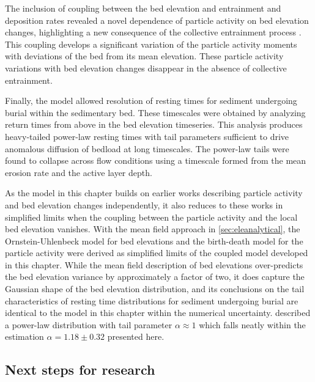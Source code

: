 The inclusion of coupling between the bed elevation and entrainment and deposition rates revealed a novel dependence of particle activity on bed elevation changes, highlighting a new consequence of the collective entrainment process \citep{Ancey2008,Lee2018}. This coupling develops a significant variation of the particle activity moments with deviations of the bed from its mean elevation. These particle activity variations with bed elevation changes disappear in the absence of collective entrainment.

Finally, the model allowed resolution of resting times for sediment undergoing burial within the sedimentary bed. These timescales were obtained by analyzing return times from above in the bed elevation timeseries.
This analysis produces heavy-tailed power-law resting times with tail parameters sufficient to drive anomalous diffusion of bedload at long timescales.
The power-law tails were found to collapse across flow conditions using a timescale formed from the mean erosion rate and the active layer depth.

As the model in this chapter builds on earlier works describing particle activity and bed elevation changes independently, it also reduces to these works in simplified limits when the coupling between the particle activity and the local bed elevation vanishes.
With the mean field approach in \DIFdelbegin {}\DIFdelend \DIFaddbegin {}\DIFaddend \ref{sec:eleanalytical}, the \citet{Martin2014} Ornstein-Uhlenbeck model for bed elevations and the \citet{Ancey2008} birth-death model for the particle activity were derived as simplified limits of the coupled model developed in this chapter.
While the mean field description of bed elevations over-predicts the bed elevation variance by approximately a factor of two, it does capture the Gaussian shape of the bed elevation distribution, and its conclusions on the tail characteristics of resting time distributions for sediment undergoing burial are identical to the model in this chapter within the numerical uncertainty.
\citet{Martin2014} described a power-law distribution with tail parameter $\alpha \approx 1$ which falls neatly within the estimation $\alpha = 1.18 \pm 0.32$ presented here.


\subsection{Next steps for research}

